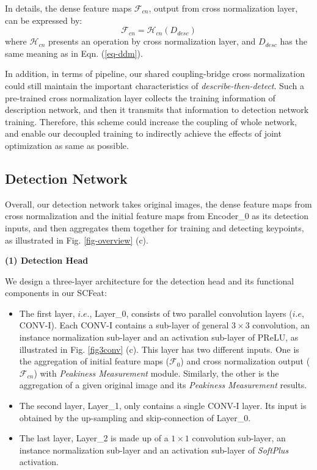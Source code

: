 \documentclass[journal]{IEEEtran}
\begin{document}
In details, the dense feature maps $\mathcal{F}_{cn}$, output from cross normalization layer, can be expressed by:
\begin{equation}\label{eq-dmap-cn}
        \mathcal{F}_{cn}=\mathcal{H}_{cn}(D_{desc})
\end{equation}
where $\mathcal{H}_{cn}$ presents an operation by cross normalization layer, and $D_{desc}$ has the same meaning as in Eqn. (\ref{eq-ddm}). 

In addition, in terms of pipeline, our shared coupling-bridge cross normalization could still maintain the important characteristics of \emph{describe-then-detect}.
Such a pre-trained cross normalization layer collects the training information of description network, and then it transmits that information to detection network training. 
Therefore, this scheme could increase the coupling of whole network, and enable our decoupled training to indirectly achieve the effects of joint optimization as same as possible. 




\subsection{Detection Network} \label{detect}
Overall, our detection network takes original images, the dense feature maps from cross normalization and the initial feature maps from Encoder\_0 as its detection inputs, and then aggregates them together for 
training and detecting keypoints, as illustrated in Fig. \ref{fig-overview} (c). 

\textbf{(1) Detection Head}

We design a three-layer architecture for the detection head and its functional components in our SCFeat:
\begin{itemize}
\item{The first layer, $i.e.$, Layer\_0, consists of two parallel convolution layers ($i.e$, CONV-I). 
Each CONV-I contains a sub-layer of general $3\times3$  convolution, an instance normalization sub-layer and an activation sub-layer of PReLU, as illustrated in Fig. \ref{fig3conv} (c).
This layer has two different inputs. One is the aggregation of initial feature maps ($\mathcal{F}_0$) and cross normalization output ($\mathcal{F}_{cn}$) with \emph{Peakiness Measurement} module. Similarly, the other is the aggregation of a given original image and its \emph{Peakiness Measurement} results.
 }
 
\item{The second layer, Layer\_1, only contains a single CONV-I layer. Its input is obtained by the up-sampling and skip-connection of Layer\_0.
}
\item{The last layer, Layer\_2 is made up of a $1\times1$ convolution sub-layer, an instance normalization sub-layer and an activation sub-layer of \emph{SoftPlus} activation.
}
\end{itemize}
\end{document}
